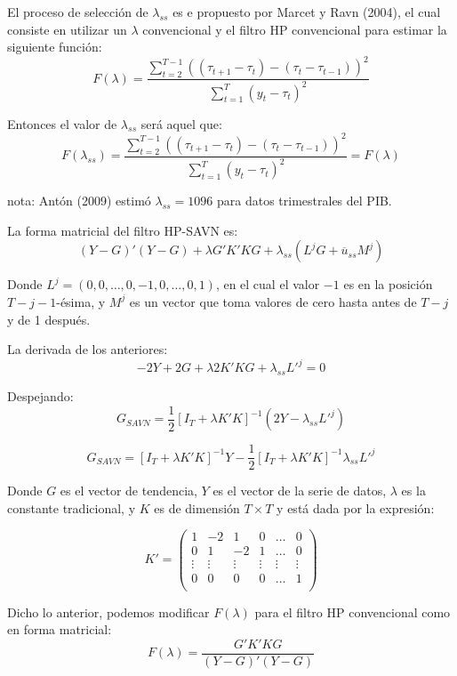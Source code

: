 \documentclass[
]{book}
\begin{document}
El proceso de selección de \(\lambda_{ss}\) es e propuesto por Marcet y Ravn (2004), el cual consiste en utilizar un \(\lambda\) convencional y el filtro HP convencional para estimar la siguiente función:
\[F(\lambda) = \frac{\sum_{t=2}^{T-1} ((\tau_{t+1} - \tau_t) - (\tau_t - \tau_{t-1}))^2}{\sum_{t=1}^T (y_t - \tau_t)^2}\]

Entonces el valor de \(\lambda_{ss}\) será aquel que:
\[F(\lambda_{ss}) = \frac{\sum_{t=2}^{T-1} ((\tau_{t+1} - \tau_t) - (\tau_t - \tau_{t-1}))^2}{\sum_{t=1}^T (y_t - \tau_t)^2} = F(\lambda)\]

nota: Antón (2009) estimó \(\lambda_{ss} = 1096\) para datos trimestrales del PIB.

La forma matricial del filtro HP-SAVN es:
\[(Y - G)'(Y - G) + \lambda G' K' K G + \lambda_{ss} (L^j G + \overline{u}_{ss} M^j)\]

Donde \(L^j = (0, 0, \ldots, 0, -1, 0, \ldots, 0, 1)\), en el cual el valor \(-1\) es en la posición \(T-j-1\)-ésima, y \(M^j\) es un vector que toma valores de cero hasta antes de \(T-j\) y de 1 después.

La derivada de los anteriores:
\[-2 Y + 2 G + \lambda 2 K' K G + \lambda_{ss} L'^j = 0\]

Despejando:
\[G_{SAVN} = \frac{1}{2} [I_T + \lambda K' K]^{-1} (2 Y - \lambda_{ss} L'^j)\]

\[G_{SAVN} = [I_T + \lambda K' K]^{-1} Y - \frac{1}{2} [I_T + \lambda K' K]^{-1} \lambda_{ss} L'^j\]

Donde \(G\) es el vector de tendencia, \(Y\) es el vector de la serie de datos, \(\lambda\) es la constante tradicional, y \(K\) es de dimensión \(T \times T\) y está dada por la expresión:

\[K' =
\begin{pmatrix}
1 & -2 & 1 & 0 & \ldots & 0 \\
0 & 1 & -2 & 1 & \ldots & 0 \\
\vdots & \vdots &  \vdots &  \vdots &  \vdots &  \vdots \\
0 & 0 & 0 & 0 & \ldots & 1 \\
\end{pmatrix}
\]

Dicho lo anterior, podemos modificar \(F(\lambda)\) para el filtro HP convencional como en forma matricial:
\[F(\lambda) = \frac{G' K' K G}{(Y - G)'(Y - G)}\]

  
\end{document}
